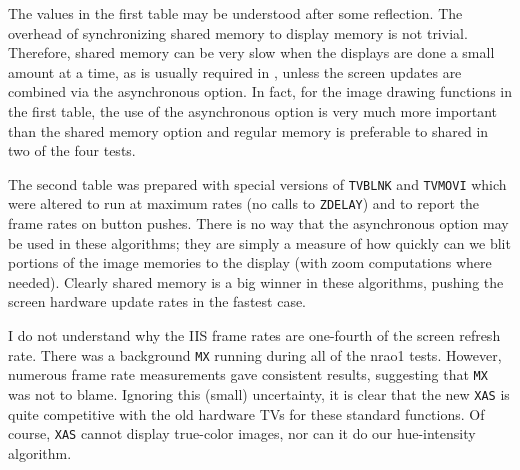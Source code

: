 The values in the first table may be understood after some reflection.
The overhead of synchronizing shared memory to display memory is not
trivial.   Therefore, shared memory can be very slow when the displays
are done a small amount at a time, as is usually required in
\hbox{\AIPS}, unless the screen updates are combined via the
asynchronous option.  In fact, for the image drawing functions in the
first table, the use of the asynchronous option is very much more
important than the shared memory option and regular memory is
preferable to shared in two of the four tests.

The second table was prepared with special versions of {\tt TVBLNK}
and {\tt TVMOVI} which were altered to run at maximum rates (no calls
to {\tt ZDELAY}) and to report the frame rates on button pushes.
There is no way that the asynchronous option may be used in these
algorithms; they are simply a measure of how quickly can we blit
portions of the image memories to the display (with zoom computations
where needed).  Clearly shared memory is a big winner in these
algorithms, pushing the screen hardware update rates in the fastest
case.

I do not understand why the IIS frame rates are one-fourth of the
screen refresh rate.  There was a background {\tt MX} running during
all of the nrao1 tests.  However, numerous frame rate measurements
gave consistent results, suggesting that {\tt MX} was not to blame.
Ignoring this (small) uncertainty, it is clear that the new {\tt XAS}
is quite competitive with the old hardware TVs for these standard
functions.  Of course, {\tt XAS} cannot display true-color images, nor
can it do our hue-intensity algorithm.

